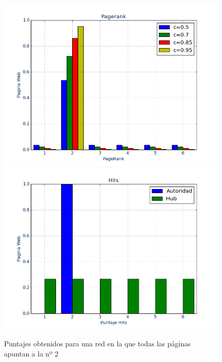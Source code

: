 \documentclass[a4paper]{article}
\begin{document}
\begin{figure}[htbp]
\centering
\includegraphics[scale=0.385]{img/todosal2.png}
\includegraphics[scale=0.385]{img/todosal2out.png}
\caption{Puntajes obtenidos para una red en la que todas las páginas apuntan a la nº 2}
\end{figure}
\end{document}
